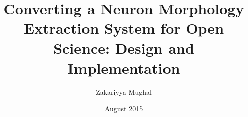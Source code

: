 \title{\bf \large Converting a Neuron Morphology Extraction
System for Open Science: Design and Implementation}
\author{Zakariyya Mughal}
\date{August 2015}



